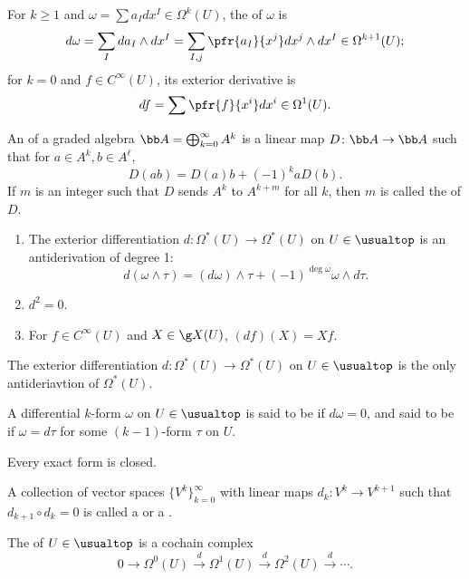 For $k \ge 1$ and $\omega = \sum a_I dx^I \in \Omega^k(U)$, the  of $\omega$ is
\[
d\omega = \sum_I da_I \wedge dx^I = \sum_{I,j} \pfr{a_I}{x^j} dx^j \wedge dx^I \in \Omega^{k+1}(U);
\]
for $k = 0$ and $f \in C^\infty(U)$, its exterior derivative is
\[
df = \sum \pfr{f}{x^i} dx^i\in \Omega^1 (U).
\]

An  of a graded algebra $\bb A = \bigoplus_{k=0}^\infty A^k$ is a linear map $D \colon \bb A \to \bb A$ such that for $a \in A^k, b \in A^\ell$,
\[
D(ab) = D(a)b + (-1)^k aD(b).
\]
If $m$ is an integer such that $D$ sends $A^k$ to $A^{k+m}$ for all $k$, then $m$ is called the  of $D$.

\begin{enumerate}
\item The exterior differentiation $d \colon \Omega^*(U) \to \Omega^*(U)$ on $U \in \usualtop$ is an antiderivation of degree 1:
\[
d(\omega \wedge \tau) = (d\omega)\wedge \tau + (-1)^{\deg \omega} \omega \wedge d \tau.
\]
\item $d^2 = 0$.
\item For $f \in C^\infty(U)$ and $X \in \g X(U)$, $(df)(X) = Xf$.
\end{enumerate}

The exterior differentiation $d \colon \Omega^*(U) \to \Omega^*(U)$ on $U \in \usualtop$ is the only antideriavtion of $\Omega^*(U)$.

A differential $k$-form $\omega$ on $U \in \usualtop$ is said to be  if $d\omega = 0$, and said to be  if $\omega = d \tau$ for some $(k-1)$-form $\tau$ on $U$.

Every exact form is closed.

A collection of vector spaces $\{ V^k \}_{k=0}^\infty$ with linear maps $d_k \colon V^k \to V^{k+1}$ such that $d_{k+1} \circ d_k = 0$ is called a  or a .

The  of $U \in \usualtop$ is a cochain complex
\[
0 \rightarrow \Omega^0 (U) \xrightarrow{d} \Omega^1(U) \xrightarrow{d} \Omega^2 (U) \xrightarrow{d} \cdots.
\]

